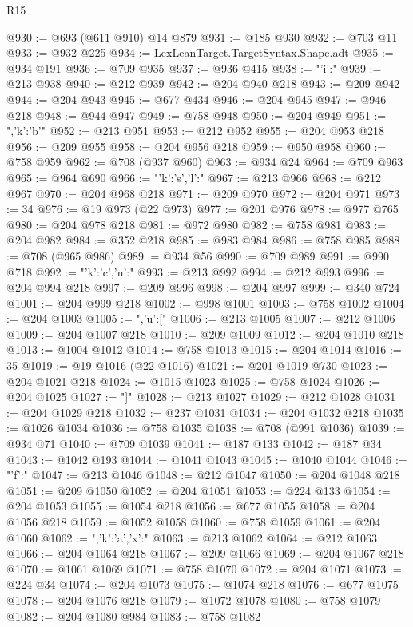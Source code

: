\begin{lexlean}{R15}
\begin{coremodule}
@930 := @693 (@611 @910) @14 @879
@931 := @185 @930
@932 := @703 @11
@933 := @932 @225
@934 := LexLeanTarget.TargetSyntax.Shape.adt
@935 := @934 @191
@936 := @709 @935
@937 := @936 @415
@938 := "{'i':"
@939 := @213 @938
@940 := @212 @939
@942 := @204 @940 @218
@943 := @209 @942
@944 := @204 @943
@945 := @677 @434
@946 := @204 @945
@947 := @946 @218
@948 := @944 @947
@949 := @758 @948
@950 := @204 @949
@951 := ",'k':'b'}"
@952 := @213 @951
@953 := @212 @952
@955 := @204 @953 @218
@956 := @209 @955
@958 := @204 @956 @218
@959 := @950 @958
@960 := @758 @959
@962 := @708 (@937 @960)
@963 := @934 @24
@964 := @709 @963
@965 := @964 @690
@966 := "{'k':'s','l':"
@967 := @213 @966
@968 := @212 @967
@970 := @204 @968 @218
@971 := @209 @970
@972 := @204 @971
@973 := 34
@976 := @19 @973 (@22 @973)
@977 := @201 @976
@978 := @977 @765
@980 := @204 @978 @218
@981 := @972 @980
@982 := @758 @981
@983 := @204 @982
@984 := @352 @218
@985 := @983 @984
@986 := @758 @985
@988 := @708 (@965 @986)
@989 := @934 @56
@990 := @709 @989
@991 := @990 @718
@992 := "{'k':'c','n':"
@993 := @213 @992
@994 := @212 @993
@996 := @204 @994 @218
@997 := @209 @996
@998 := @204 @997
@999 := @340 @724
@1001 := @204 @999 @218
@1002 := @998 @1001
@1003 := @758 @1002
@1004 := @204 @1003
@1005 := ",'u':["
@1006 := @213 @1005
@1007 := @212 @1006
@1009 := @204 @1007 @218
@1010 := @209 @1009
@1012 := @204 @1010 @218
@1013 := @1004 @1012
@1014 := @758 @1013
@1015 := @204 @1014
@1016 := 35
@1019 := @19 @1016 (@22 @1016)
@1021 := @201 @1019 @730
@1023 := @204 @1021 @218
@1024 := @1015 @1023
@1025 := @758 @1024
@1026 := @204 @1025
@1027 := "]}"
@1028 := @213 @1027
@1029 := @212 @1028
@1031 := @204 @1029 @218
@1032 := @237 @1031
@1034 := @204 @1032 @218
@1035 := @1026 @1034
@1036 := @758 @1035
@1038 := @708 (@991 @1036)
@1039 := @934 @71
@1040 := @709 @1039
@1041 := @187 @133
@1042 := @187 @34
@1043 := @1042 @193
@1044 := @1041 @1043
@1045 := @1040 @1044
@1046 := "{'f':"
@1047 := @213 @1046
@1048 := @212 @1047
@1050 := @204 @1048 @218
@1051 := @209 @1050
@1052 := @204 @1051
@1053 := @224 @133
@1054 := @204 @1053
@1055 := @1054 @218
@1056 := @677 @1055
@1058 := @204 @1056 @218
@1059 := @1052 @1058
@1060 := @758 @1059
@1061 := @204 @1060
@1062 := ",'k':'a','x':"
@1063 := @213 @1062
@1064 := @212 @1063
@1066 := @204 @1064 @218
@1067 := @209 @1066
@1069 := @204 @1067 @218
@1070 := @1061 @1069
@1071 := @758 @1070
@1072 := @204 @1071
@1073 := @224 @34
@1074 := @204 @1073
@1075 := @1074 @218
@1076 := @677 @1075
@1078 := @204 @1076 @218
@1079 := @1072 @1078
@1080 := @758 @1079
@1082 := @204 @1080 @984
@1083 := @758 @1082
}}
\end{coremodule}
\end{lexlean}
